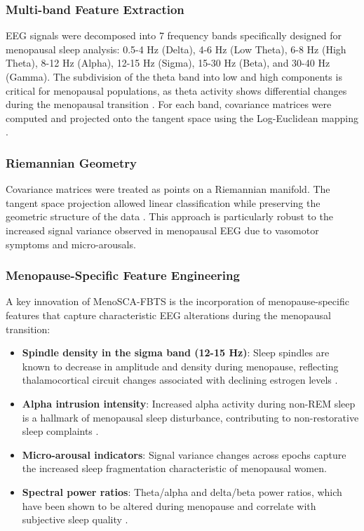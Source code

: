 \documentclass[ASNA,twocolumn]{USG}
\begin{document}
\subsubsection{Multi-band Feature Extraction}
EEG signals were decomposed into 7 frequency bands specifically designed for menopausal sleep analysis: 0.5-4 Hz (Delta), 4-6 Hz (Low Theta), 6-8 Hz (High Theta), 8-12 Hz (Alpha), 12-15 Hz (Sigma), 15-30 Hz (Beta), and 30-40 Hz (Gamma). The subdivision of the theta band into low and high components is critical for menopausal populations, as theta activity shows differential changes during the menopausal transition \cite{Baker2023}. For each band, covariance matrices were computed and projected onto the tangent space using the Log-Euclidean mapping \cite{Barachant2012}.

\subsubsection{Riemannian Geometry}
Covariance matrices were treated as points on a Riemannian manifold. The tangent space projection allowed linear classification while preserving the geometric structure of the data \cite{Congedo2017}. This approach is particularly robust to the increased signal variance observed in menopausal EEG due to vasomotor symptoms and micro-arousals.

\subsubsection{Menopause-Specific Feature Engineering}
A key innovation of MenoSCA-FBTS is the incorporation of menopause-specific features that capture characteristic EEG alterations during the menopausal transition:

\begin{itemize}
\item \textbf{Spindle density in the sigma band (12-15 Hz)}: Sleep spindles are known to decrease in amplitude and density during menopause, reflecting thalamocortical circuit changes associated with declining estrogen levels \cite{Manber2003}.
\item \textbf{Alpha intrusion intensity}: Increased alpha activity during non-REM sleep is a hallmark of menopausal sleep disturbance, contributing to non-restorative sleep complaints \cite{Baker2023}.
\item \textbf{Micro-arousal indicators}: Signal variance changes across epochs capture the increased sleep fragmentation characteristic of menopausal women.
\item \textbf{Spectral power ratios}: Theta/alpha and delta/beta power ratios, which have been shown to be altered during menopause and correlate with subjective sleep quality \cite{deZambotti2023}.
\end{itemize}
\end{document}
